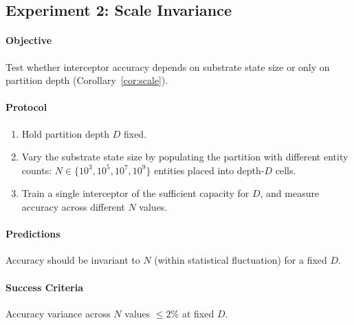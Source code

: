 \documentclass[11pt,twocolumn,a4paper]{article}
\theoremstyle{definition}
\theoremstyle{remark}
\begin{document}
\subsection{Experiment 2: Scale Invariance}

\paragraph{Objective} Test whether interceptor accuracy depends on substrate state size or only on partition depth (Corollary~\ref{cor:scale}).

\paragraph{Protocol}
\begin{enumerate}
    \item Hold partition depth $D$ fixed.
    \item Vary the substrate state size by populating the partition with different entity counts: $N \in \{10^3, 10^5, 10^7, 10^9\}$ entities placed into depth-$D$ cells.
    \item Train a single interceptor of the sufficient capacity for $D$, and measure accuracy across different $N$ values.
\end{enumerate}

\paragraph{Predictions}
Accuracy should be invariant to $N$ (within statistical fluctuation) for a fixed $D$.

\paragraph{Success Criteria}
Accuracy variance across $N$ values $\leq 2\%$ at fixed $D$.
\end{document}
